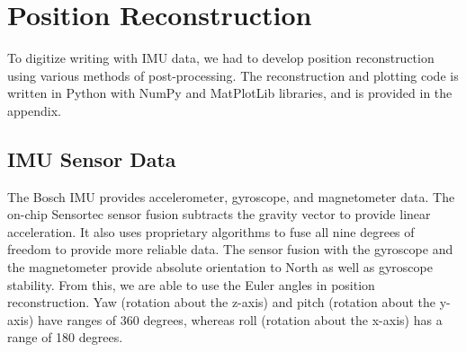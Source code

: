 \documentclass[12pt,journal]{IEEEtran}
\begin{document}
\section{Position Reconstruction}
To digitize writing with IMU data, we had to develop position reconstruction using various methods of post-processing. The reconstruction and plotting code is written in Python with NumPy and MatPlotLib libraries, and is provided in the appendix.

\subsection{IMU Sensor Data}
	The Bosch IMU provides accelerometer, gyroscope, and magnetometer data. The on-chip Sensortec sensor fusion subtracts the gravity vector to provide linear acceleration. It also uses proprietary algorithms to fuse all nine degrees of freedom to provide more reliable data. The sensor fusion with the gyroscope and the magnetometer provide absolute orientation to North as well as gyroscope stability. From this, we are able to use the Euler angles in position reconstruction. Yaw (rotation about the z-axis) and pitch (rotation about the y-axis) have ranges of 360 degrees, whereas roll (rotation about the x-axis) has a range of 180 degrees.
\end{document}
